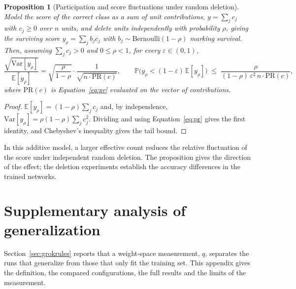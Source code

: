 \documentclass{article} %
\newtheorem{proposition}{Proposition}
\begin{document}
\begin{proposition}[Participation and score fluctuations under random deletion]
\label{prop:fluct}
Model the score of the correct class as a sum of unit contributions, $y = \sum_j c_j$ with $c_j \geq 0$ over $n$ units, and delete units independently with probability $\rho$, giving the surviving score $y_\rho = \sum_j b_j c_j$ with $b_j \sim \mathrm{Bernoulli}(1-\rho)$ marking survival. Then, assuming $\sum_j c_j>0$ and $0\leq \rho<1$, for every $\varepsilon \in (0,1)$,
\begin{equation}
\frac{\sqrt{\mathrm{Var}[y_\rho]}}{\mathbb{E}[y_\rho]}
= \sqrt{\frac{\rho}{1-\rho}} \cdot \frac{1}{\sqrt{n \cdot \mathrm{PR}(c)}},
\qquad
\mathbb{P}\big(y_\rho < (1-\varepsilon)\,\mathbb{E}[y_\rho]\big)
\;\leq\; \frac{\rho}{(1-\rho)\,\varepsilon^2 \, n \cdot \mathrm{PR}(c)},
\label{eq:fluct}
\end{equation}
where $\mathrm{PR}(c)$ is Equation~\ref{eq:pr} evaluated on the vector of contributions.
\end{proposition}
\begin{proof}
$\mathbb{E}[y_\rho] = (1-\rho) \sum_j c_j$ and, by independence, $\mathrm{Var}[y_\rho] = \rho(1-\rho) \sum_j c_j^2$. Dividing and using Equation~\ref{eq:pr} gives the first identity, and Chebyshev's inequality gives the tail bound.
\end{proof}

In this additive model, a larger effective count reduces the relative fluctuation of the score under independent random deletion. The proposition gives the direction of the effect; the deletion experiments establish the accuracy differences in the trained networks.

\section{Supplementary analysis of generalization}
\label{app:generalization}

Section~\ref{sec:grokrules} reports that a weight-space measurement, $q$, separates the runs that generalize from those that only fit the training set. This appendix gives the definition, the compared configurations, the full results and the limits of the measurement.
\end{document}
